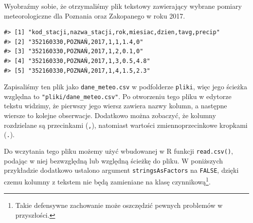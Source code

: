 \documentclass[paper=6in:9in,pagesize=pdftex,headinclude=on,footinclude=on,10pt]{scrbook}
\newenvironment{Shaded}{\begin{snugshade}}{\end{snugshade}}
\newcommand{\CommentTok}[1]{\textcolor[rgb]{0.56,0.35,0.01}{\textit{#1}}}
\newcommand{\DataTypeTok}[1]{\textcolor[rgb]{0.13,0.29,0.53}{#1}}
\newcommand{\KeywordTok}[1]{\textcolor[rgb]{0.13,0.29,0.53}{\textbf{#1}}}
\newcommand{\NormalTok}[1]{#1}
\newcommand{\OtherTok}[1]{\textcolor[rgb]{0.56,0.35,0.01}{#1}}
\newcommand{\StringTok}[1]{\textcolor[rgb]{0.31,0.60,0.02}{#1}}
\begin{document}
Wyobraźmy sobie, że otrzymaliśmy plik tekstowy zawierający wybrane pomiary meteorologiczne dla Poznania oraz Zakopanego w roku 2017.

\begin{verbatim}
#> [1] "kod_stacji,nazwa_stacji,rok,miesiac,dzien,tavg,precip"
#> [2] "352160330,POZNAŃ,2017,1,1,1.4,0"                      
#> [3] "352160330,POZNAŃ,2017,1,2,0.1,0"                      
#> [4] "352160330,POZNAŃ,2017,1,3,0.5,4.8"                    
#> [5] "352160330,POZNAŃ,2017,1,4,1.5,2.3"
\end{verbatim}

Zapisaliśmy ten plik jako \texttt{dane\_meteo.csv} w podfolderze \texttt{pliki}, więc jego ścieżka względna to \texttt{"pliki/dane\_meteo.csv"}.
Po otworzeniu tego pliku w edytorze tekstu widzimy, że pierwszy jego wiersz zawiera nazwy kolumn, a następne wiersze to kolejne obserwacje.
Dodatkowo można zobaczyć, że kolumny rozdzielane są przecinkami (\texttt{,}), natomiast wartości zmiennoprzecinkowe kropkami (\texttt{.}).

Do wczytania tego pliku możemy użyć wbudowanej w R funkcji \texttt{read.csv()}, podając w niej bezwzględną lub względną ścieżkę do pliku.
W poniższych przykładzie dodatkowo ustalono argument \texttt{stringsAsFactors} na \texttt{FALSE}, dzięki czemu kolumny z tekstem nie będą zamieniane na klasę czynnikową\footnote{Takie defensywne zachowanie może oszczędzić pewnych problemów w przyszłości.}.

\begin{Shaded}
\end{Shaded}
\end{document}

